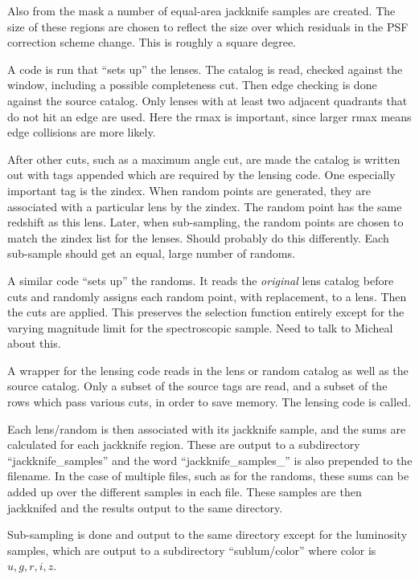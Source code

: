 \documentclass{emulateapj}
\newcommand{\ugriz}{$u, g, r, i, z$}
\begin{document}
Also from the mask a number of equal-area jackknife samples are created. The
size of these regions are chosen to reflect the size over which residuals in
the PSF correction scheme change.  This is roughly a square degree.

A code is run that ``sets up'' the lenses.  The catalog is read, checked
against the window, including a possible completeness cut.  Then edge checking
is done against the source catalog.  Only lenses with at least two adjacent
quadrants that do not hit an edge are used.  Here the rmax is important, since
larger rmax means edge collisions are more likely.

After other cuts, such as a maximum angle cut, are made the catalog is written
out with tags appended which are required by the lensing code.  One especially
important tag is the zindex.  When random points are generated, they are
associated with a particular lens by the zindex.  The random point has the same
redshift as this lens.  Later, when sub-sampling, the random points are chosen
to match the zindex list for the lenses.  Should probably do this differently.
Each sub-sample should get an equal, large number of randoms.

A similar code ``sets up'' the randoms.  It reads the \emph{original} lens
catalog before cuts and randomly assigns each random point, with replacement,
to a lens.  Then the cuts are applied.  This preserves the selection function
entirely except for the varying magnitude limit for the spectroscopic sample.
Need to talk to Micheal about this.

A wrapper for the lensing code reads in the lens or random catalog as well
as the source catalog.  Only a subset of the source tags are read, and a
subset of the rows which pass various cuts, in order to save memory.
The lensing code is called.

Each lens/random is then associated with its jackknife sample, and the sums are
calculated for each jackknife region. These are output to a subdirectory
``jackknife\_samples'' and the word ``jackknife\_samples\_'' is also prepended to
the filename.  In the case of multiple files, such as for the randoms, these
sums can be added up over the different samples in each file.  These samples
are then jackknifed and the results output to the same directory.

Sub-sampling is done and output to the same directory except for the luminosity
samples, which are output to a subdirectory ``sublum/color'' where color is
\ugriz.
\end{document}
